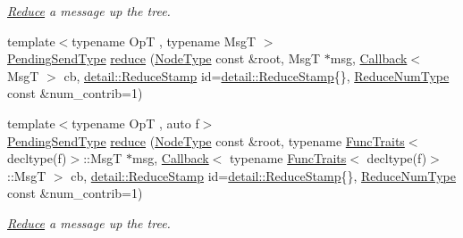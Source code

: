 \begin{DoxyCompactItemize}
\begin{DoxyCompactList}\small\item\em \hyperlink{structvt_1_1collective_1_1reduce_1_1_reduce}{Reduce} a message up the tree. \end{DoxyCompactList}\item 
{\footnotesize template$<$typename OpT , typename MsgT $>$ }\\\hyperlink{structvt_1_1collective_1_1reduce_1_1_reduce_a0474b491f3c93014d9a0ce0356c6bfd5}{Pending\+Send\+Type} \hyperlink{structvt_1_1collective_1_1reduce_1_1_reduce_a381010aca8dc21470b35b6e4604ca6f0}{reduce} (\hyperlink{namespacevt_a866da9d0efc19c0a1ce79e9e492f47e2}{Node\+Type} const \&root, MsgT $\ast$msg, \hyperlink{namespacevt_a57b238783d05de96bc2c4027f7073b7f}{Callback}$<$ MsgT $>$ cb, \hyperlink{namespacevt_1_1collective_1_1reduce_1_1detail_abcd205dec83706f347d55c7528bf2664}{detail\+::\+Reduce\+Stamp} id=\hyperlink{namespacevt_1_1collective_1_1reduce_1_1detail_abcd205dec83706f347d55c7528bf2664}{detail\+::\+Reduce\+Stamp}\{\}, \hyperlink{structvt_1_1collective_1_1reduce_1_1_reduce_a6c3e63aca10c31d2823b0b18cf9762a4}{Reduce\+Num\+Type} const \&num\+\_\+contrib=1)
\item 
{\footnotesize template$<$typename OpT , auto f$>$ }\\\hyperlink{structvt_1_1collective_1_1reduce_1_1_reduce_a0474b491f3c93014d9a0ce0356c6bfd5}{Pending\+Send\+Type} \hyperlink{structvt_1_1collective_1_1reduce_1_1_reduce_a715bd2de0a6af6294657cf684291228f}{reduce} (\hyperlink{namespacevt_a866da9d0efc19c0a1ce79e9e492f47e2}{Node\+Type} const \&root, typename \hyperlink{structvt_1_1_func_traits}{Func\+Traits}$<$ decltype(f)$>$\+::MsgT $\ast$msg, \hyperlink{namespacevt_a57b238783d05de96bc2c4027f7073b7f}{Callback}$<$ typename \hyperlink{structvt_1_1_func_traits}{Func\+Traits}$<$ decltype(f)$>$\+::MsgT $>$ cb, \hyperlink{namespacevt_1_1collective_1_1reduce_1_1detail_abcd205dec83706f347d55c7528bf2664}{detail\+::\+Reduce\+Stamp} id=\hyperlink{namespacevt_1_1collective_1_1reduce_1_1detail_abcd205dec83706f347d55c7528bf2664}{detail\+::\+Reduce\+Stamp}\{\}, \hyperlink{structvt_1_1collective_1_1reduce_1_1_reduce_a6c3e63aca10c31d2823b0b18cf9762a4}{Reduce\+Num\+Type} const \&num\+\_\+contrib=1)
\begin{DoxyCompactList}\small\item\em \hyperlink{structvt_1_1collective_1_1reduce_1_1_reduce}{Reduce} a message up the tree. \end{DoxyCompactList}\item 

\end{DoxyCompactItemize}
